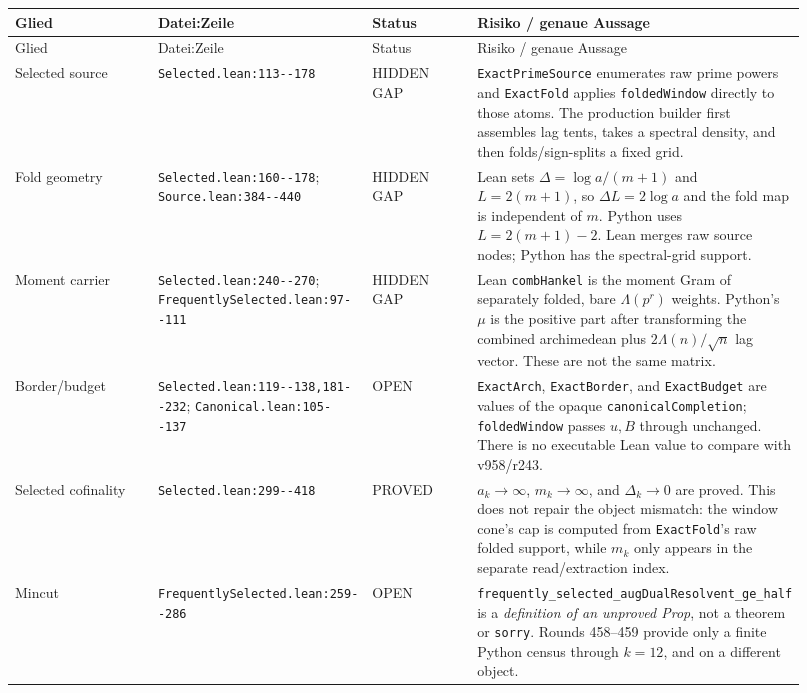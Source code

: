 \documentclass[10pt]{article}
\newcommand{\ok}{\textcolor{green!45!black}{PROVED}}
\newcommand{\gap}{\textcolor{red!75!black}{HIDDEN GAP}}
\newcommand{\open}{\textcolor{orange!80!black}{OPEN}}
\newcommand{\code}[1]{\nolinkurl{#1}}
\begin{document}
\small
\begin{longtable}{@{}p{0.19\linewidth}p{0.24\linewidth}p{0.14\linewidth}p{0.35\linewidth}@{}}
\toprule
Glied & Datei:Zeile & Status & Risiko / genaue Aussage \\
\midrule
\endfirsthead
\toprule
Glied & Datei:Zeile & Status & Risiko / genaue Aussage \\
\midrule
\endhead
Selected source & \code{Selected.lean:113--178} & \gap &
\code{ExactPrimeSource} enumerates raw prime powers and
\code{ExactFold} applies \code{foldedWindow} directly to those atoms.
The production builder first assembles lag tents, takes a spectral
density, and then folds/sign-splits a fixed grid. \\

Fold geometry & \code{Selected.lean:160--178};
\code{Source.lean:384--440} & \gap &
Lean sets $\Delta=\log a/(m+1)$ and $L=2(m+1)$, so
$\Delta L=2\log a$ and the fold map is independent of $m$.
Python uses $L=2(m+1)-2$.  Lean merges raw source nodes; Python has
the spectral-grid support. \\

Moment carrier & \code{Selected.lean:240--270};
\code{FrequentlySelected.lean:97--111} & \gap &
Lean \code{combHankel} is the moment Gram of separately folded,
bare $\Lambda(p^r)$ weights.  Python's $\mu$ is the positive part
after transforming the combined archimedean plus
$2\Lambda(n)/\sqrt n$ lag vector.  These are not the same matrix. \\

Border/budget & \code{Selected.lean:119--138,181--232};
\code{Canonical.lean:105--137} & \open &
\code{ExactArch}, \code{ExactBorder}, and \code{ExactBudget} are
values of the opaque \code{canonicalCompletion}; \code{foldedWindow}
passes $u,B$ through unchanged.  There is no executable Lean value
to compare with v958/r243. \\

Selected cofinality & \code{Selected.lean:299--418} & \ok &
$a_k\to\infty$, $m_k\to\infty$, and $\Delta_k\to0$ are proved.
This does not repair the object mismatch: the window cone's cap is
computed from \code{ExactFold}'s raw folded support, while $m_k$ only
appears in the separate read/extraction index. \\

Mincut & \code{FrequentlySelected.lean:259--286} & \open &
\code{frequently_selected_augDualResolvent_ge_half} is a
\emph{definition of an unproved Prop}, not a theorem or \code{sorry}.
Rounds 458--459 provide only a finite Python census through $k=12$,
and on a different object. \\


\end{longtable}
\end{document}
